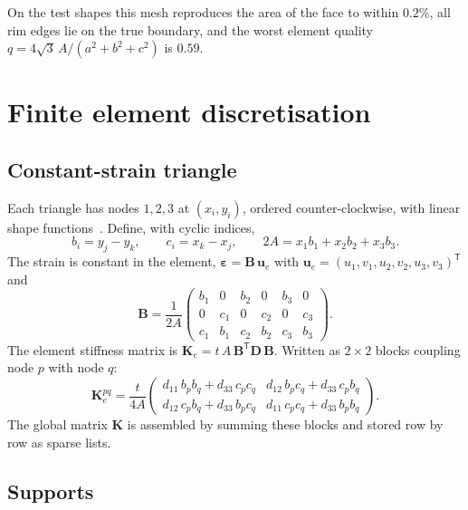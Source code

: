 \documentclass[11pt,a4paper]{article}
\newcommand{\vect}[1]{\mathbf{#1}}
\newcommand{\mat}[1]{\mathbf{#1}}
\begin{document}
On the test shapes this mesh reproduces the area of the face to within
$0.2\%$, all rim edges lie on the true boundary, and the worst element
quality $q = 4\sqrt{3}\,A/(a^2+b^2+c^2)$ is $0.59$.

\section{Finite element discretisation}

\subsection{Constant-strain triangle}

Each triangle has nodes $1,2,3$ at $(x_i,y_i)$, ordered counter-clockwise,
with linear shape functions~\cite{zienkiewicz}. Define, with cyclic indices,
\begin{equation}
  b_i = y_j - y_k, \qquad c_i = x_k - x_j, \qquad
  2A = x_1 b_1 + x_2 b_2 + x_3 b_3 .
\end{equation}
The strain is constant in the element,
$\boldsymbol{\varepsilon} = \mat{B}\,\vect{u}_e$ with
$\vect{u}_e = (u_1,v_1,u_2,v_2,u_3,v_3)^{\mathsf T}$ and
\begin{equation}
  \mat{B} = \frac{1}{2A}
  \begin{pmatrix}
    b_1 & 0 & b_2 & 0 & b_3 & 0\\
    0 & c_1 & 0 & c_2 & 0 & c_3\\
    c_1 & b_1 & c_2 & b_2 & c_3 & b_3
  \end{pmatrix}.
  \label{eq:B}
\end{equation}
The element stiffness matrix is
$\mat{K}_e = t\,A\,\mat{B}^{\mathsf T}\mat{D}\,\mat{B}$. Written as $2\times2$
blocks coupling node $p$ with node $q$:
\begin{equation}
  \mat{K}_e^{pq} = \frac{t}{4A}
  \begin{pmatrix}
    d_{11}\,b_p b_q + d_{33}\,c_p c_q & d_{12}\,b_p c_q + d_{33}\,c_p b_q\\[2pt]
    d_{12}\,c_p b_q + d_{33}\,b_p c_q & d_{11}\,c_p c_q + d_{33}\,b_p b_q
  \end{pmatrix}.
  \label{eq:Ke}
\end{equation}
The global matrix $\mat{K}$ is assembled by summing these blocks and stored
row by row as sparse lists.

\subsection{Supports}
\end{document}
